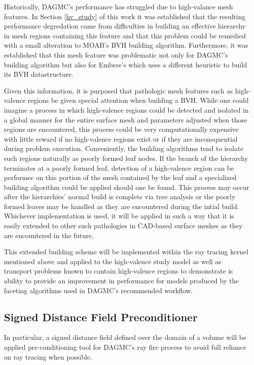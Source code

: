 \documentclass[12pt, a4paper]{article}
\begin{document}
Historically, DAGMC's performance has struggled due to high-valance mesh features. In Section \ref{hv_study} of this work it was established that the resulting performance degredation came from difficulties in building an effective hierarchy in mesh regions containing this feature and that this problem could be remedied with a small alteration to MOAB's BVH building algorithm. Furthermore, it was established that this mesh feature was problematic not only for DAGMC's building algorithm but also for Embree's which uses a different heuristic to build its BVH datastructure.

Given this information, it is purposed that pathologic mesh features such as high-valence regions be given special attention when building a BVH. While one could imagine a process in which high-valence regions could be detected and isolated in a global manner for the entire surface mesh and parameters adjusted when those regions are encountered, this process could be very computationally expensive with little reward if no high-valence regions exist or if they are inconsquential during problem execution. Conveniently, the building algorithms tend to isolate such regions naturally as poorly formed leaf nodes. If the branch of the hierarchy terminates at a poorly formed leaf, detection of a high-valence region can be performec on this portion of the mesh contained by the leaf and a specialized building algorithm could be applied should one be found. This process may occur after the hierarchies' normal build is complete via tree analysis or the poorly formed leaves may be handled as they are encountered during the intial build. Whichever implementation is used, it will be applied in such a way that it is easily extended to other such pathologies in CAD-based surface meshes as they are encountered in the future.

This extended building scheme will be implemented within the ray tracing kernel mentioned above and applied to the high-valence study model as well as transport problems known to cantain high-valence regions to demonstrate is ability to provide an improvement in performance for models produced by the faceting algorithms used in DAGMC's recommended workflow.

\subsection{Signed Distance Field Preconditioner}

In particular, a signed distance field defined over the domain of a volume will be applied pre-conditioning tool for DAGMC's ray fire process to avoid full reliance on ray tracing when possible.
\end{document}
